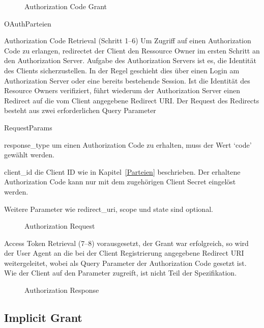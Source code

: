 \begin{figure}[h]
    \scalebox{.7}{
        
    }
    \caption{Authorization Code Grant}\label{fig: Authorization Code Grant}
\end{figure}

\begin{labeling}{OAuthParteien}
    \item [Authorization Code Retrieval (Schritt 1--6)] Um Zugriff auf einen Authorization Code
    zu erlangen, redirectet der Client den Ressource Owner im ersten Schritt
    an den Authorization Server. Aufgabe des Authorization Servers ist es,
    die Identität des Clients sicherzustellen. In der Regel geschieht dies über
    einen Login am Authorization Server oder eine bereits bestehende Session.
    Ist die Identität des Resource Owners verifiziert, führt wiederum der
    Authorization Server einen Redirect auf die vom Client angegebene Redirect
    URI. Der Request des Redirects besteht aus zwei erforderlichen Query
    Parameter
    \begin{labeling}{RequestParams}
        \item [response\_type] um einen Authorization Code zu erhalten,
        muss der Wert `code' gewählt werden.
        \item [client\_id] die Client ID wie in Kapitel~\ref{Parteien}
        beschrieben. Der erhaltene Authorization Code kann nur mit dem
        zugehörigen Client Secret eingelöst werden.
    \end{labeling}
    Weitere Parameter wie redirect\_uri, scope und state sind optional.
    \begin{figure}[h]
        
        \caption{Authorization Request}\label{ls: Authorization Request}
    \end{figure}

    \item [Access Token Retrieval (7--8)] vorausgesetzt, der Grant war erfolgreich,
    so wird der User Agent an die bei der Client Registrierung angegebene
    Redirect URI weitergeleitet, wobei als Query Parameter der Authorization
    Code gesetzt ist. Wie der Client auf den Parameter zugreift, ist nicht Teil
    der Spezifikation.
    \begin{figure}[h]
        
        \caption{Authorization Response}\label{ls: Authorization Response}
    \end{figure}
\end{labeling}

\subsection{Implicit Grant}\label{ssec:implicit}

\blindtext{}
